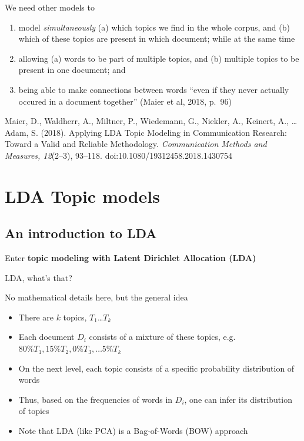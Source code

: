 \documentclass{beamer}
\begin{document}
\begin{frame}{We need other models to}
\begin{enumerate}[<+->]
	\item model \emph{simultaneously} (a) which topics we find in the whole corpus, and (b) which of these topics are present in which document; while at the same time
	\item allowing (a) words to be part of multiple topics, and (b) multiple topics to be present in one document; and
	\item being able to make connections between words ``even if they never actually occured in a document together'' (Maier et al, 2018, p.~96)
\end{enumerate}

\tiny{Maier, D., Waldherr, A., Miltner, P., Wiedemann, G., Niekler, A., Keinert, A., \ldots Adam, S. (2018). Applying LDA Topic Modeling in Communication Research: Toward a Valid and Reliable Methodology. \textit{Communication Methods and Measures, 12}(2--3), 93--118. doi:10.1080/19312458.2018.1430754}
\end{frame}



\section{LDA Topic models}

\subsection{An introduction to LDA}

\begin{frame}{}
	Enter \textbf{topic modeling with Latent Dirichlet Allocation (LDA)}
\end{frame}






\begin{frame}{LDA, what's that?}
	\begin{block}{No mathematical details here, but the general idea}
		\begin{itemize}
			\item There are $k$ topics, $T_1$\ldots$T_k$
			\item Each document $D_i$ consists of a mixture of these topics, e.g.$80\% T_1, 15\% T_2, 0\% T_3, \ldots 5\% T_k $
			\item On the next level, each topic consists of a specific probability distribution of words
			\item Thus, based on the frequencies of words in $D_i$, one can infer its distribution of topics
			\item Note that LDA (like PCA) is a Bag-of-Words (BOW) approach
		\end{itemize}
	\end{block}
	
\end{frame}
\end{document}
